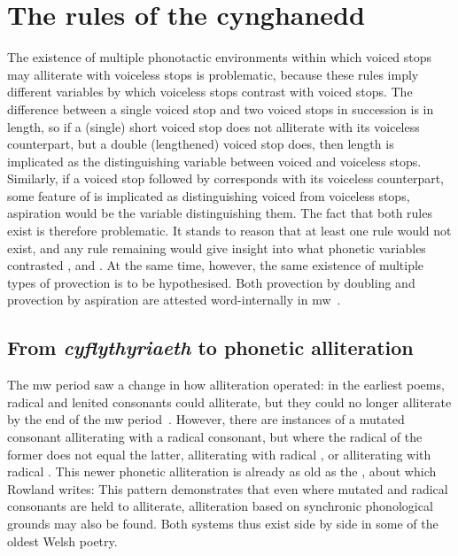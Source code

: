 \section{The rules of the cynghanedd}
\label{sec:rules-cynghanedd}

The existence of multiple phonotactic environments within which voiced stops may alliterate with voiceless stops is problematic, because these rules imply different variables by which voiceless stops contrast with voiced stops. The difference between a single voiced stop and two voiced stops in succession is in length, so if a (single) short voiced stop does not alliterate with its voiceless counterpart, but a double (lengthened) voiced stop does, then  length is implicated as the distinguishing variable between voiced and voiceless stops. Similarly, if a voiced stop followed by  corresponds with its voiceless counterpart, some feature of  is implicated as distinguishing voiced from voiceless stops, \ie aspiration would be the variable distinguishing them. The fact that both rules exist is therefore problematic. It stands to reason that at least one rule would not exist, and any rule remaining would give insight into what phonetic variables contrasted , and . At the same time, however, the same existence of multiple types of provection is to be hypothesised. Both provection by doubling and provection by aspiration are attested word-internally in \gls{mw}~\autocite[§~17]{evans_grammar_1964}.

\subsection{From \textit{cyflythyriaeth} to phonetic alliteration}
\label{sec:from-allit-text}
The \gls{mw} period saw a change in how alliteration operated: in the earliest poems, radical and lenited consonants could alliterate, but they could no longer alliterate by the end of the \gls{mw} period~\autocite[339]{rowland_early_1990}. However, there are instances of a mutated consonant alliterating with a radical consonant, but where the radical of the former does not equal the latter, \eg {} alliterating with radical , or  alliterating with radical . This newer phonetic alliteration is already as old as the , about which Rowland writes: 
This pattern demonstrates that even where mutated and radical consonants are held to alliterate, alliteration based on synchronic phonological grounds may also be found. Both systems thus exist side by side in some of the oldest Welsh poetry. 

